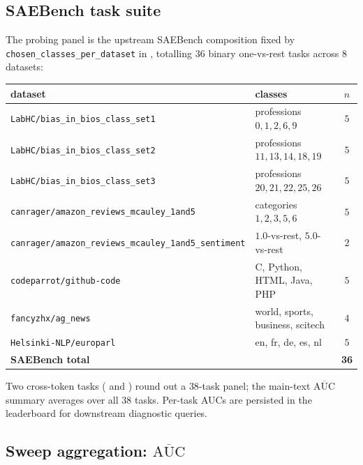 \subsection{SAEBench task suite}
\label{app:c3-tasks}

The probing panel is the upstream SAEBench composition fixed by \texttt{chosen\_classes\_per\_dataset} in , totalling $36$ binary one-vs-rest tasks across $8$ datasets:

\begin{table}[t]
    \centering
    \footnotesize
    \begin{tabular}{l l c}
        \toprule
        dataset & classes & $n$ \\
        \midrule
        \texttt{LabHC/bias\_in\_bios\_class\_set1} & professions $0, 1, 2, 6, 9$ & $5$ \\
        \texttt{LabHC/bias\_in\_bios\_class\_set2} & professions $11, 13, 14, 18, 19$ & $5$ \\
        \texttt{LabHC/bias\_in\_bios\_class\_set3} & professions $20, 21, 22, 25, 26$ & $5$ \\
        \texttt{canrager/amazon\_reviews\_mcauley\_1and5} & categories $1, 2, 3, 5, 6$ & $5$ \\
        \texttt{canrager/amazon\_reviews\_mcauley\_1and5\_sentiment} & $1.0$-vs-rest, $5.0$-vs-rest & $2$ \\
        \texttt{codeparrot/github-code} & C, Python, HTML, Java, PHP & $5$ \\
        \texttt{fancyzhx/ag\_news} & world, sports, business, scitech & $4$ \\
        \texttt{Helsinki-NLP/europarl} & en, fr, de, es, nl & $5$ \\
        \midrule
        \textbf{SAEBench total} & & \textbf{36} \\
        \bottomrule
    \end{tabular}
\end{table}

Two cross-token tasks ( and ) round out a $38$-task panel; the main-text $\overline{\mathrm{AUC}}$ summary averages over all $38$ tasks. Per-task AUCs are persisted in the leaderboard for downstream diagnostic queries.

\subsection{Sweep aggregation: $\overline{\mathrm{AUC}}$}
\label{app:c3-summary-metric}

